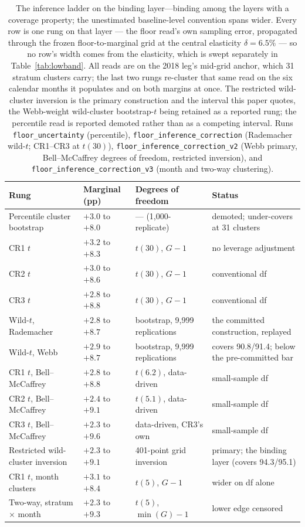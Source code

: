 \documentclass[12pt]{article}
\begin{document}
\begin{table}[!t]
\centering
\caption{The inference ladder on the binding layer---binding among the layers with a coverage property; the unestimated baseline-level convention spans wider. Every row is one rung on that layer --- the floor read's own sampling error, propagated through the frozen floor-to-marginal grid at the central elasticity $\delta = 6.5\%$ --- so no row's width comes from the elasticity, which is swept separately in Table~\ref{tab:lowband}. All reads are on the 2018 leg's mid-grid anchor, which 31 stratum clusters carry; the last two rungs re-cluster that same read on the six calendar months it populates and on both margins at once. The restricted wild-cluster inversion is the primary construction and the interval this paper quotes, the Webb-weight wild-cluster bootstrap-$t$ being retained as a reported rung; the percentile read is reported demoted rather than as a competing interval. Runs \texttt{floor\_uncertainty} (percentile), \texttt{floor\_inference\_correction} (Rademacher wild-$t$; CR1--CR3 at $t(30)$), \texttt{floor\_inference\_correction\_v2} (Webb primary, Bell--McCaffrey degrees of freedom, restricted inversion), and \texttt{floor\_inference\_correction\_v3} (month and two-way clustering).}
\label{tab:ladder}
\footnotesize
\begin{threeparttable}
\begin{tabular}{@{}llll@{}}
\toprule
Rung & Marginal (pp) & Degrees of freedom & Status \\
\midrule
Percentile cluster bootstrap & $+3.0$ to $+8.0$ & --- (1{,}000-replicate) & demoted; under-covers at 31 clusters \\
CR1 $t$ & $+3.2$ to $+8.3$ & $t(30)$, $G-1$ & no leverage adjustment \\
CR2 $t$ & $+3.0$ to $+8.6$ & $t(30)$, $G-1$ & conventional df \\
CR3 $t$ & $+2.8$ to $+8.8$ & $t(30)$, $G-1$ & conventional df \\
Wild-$t$, Rademacher & $+2.8$ to $+8.7$ & bootstrap, 9{,}999 replications & the committed construction, replayed \\
Wild-$t$, Webb & $+2.9$ to $+8.7$ & bootstrap, 9{,}999 replications & covers 90.8/91.4; below the pre-committed bar \\
CR1 $t$, Bell--McCaffrey & $+2.8$ to $+8.8$ & $t(6.2)$, data-driven & small-sample df \\
CR2 $t$, Bell--McCaffrey & $+2.4$ to $+9.1$ & $t(5.1)$, data-driven & small-sample df \\
CR3 $t$, Bell--McCaffrey & $+2.3$ to $+9.6$ & data-driven, CR3's own & small-sample df \\
Restricted wild-cluster inversion & $+2.3$ to $+9.1$ & 401-point grid inversion & primary; the binding layer (covers 94.3/95.1) \\
CR1 $t$, month clusters & $+3.1$ to $+8.4$ & $t(5)$, $G-1$ & wider on df alone \\
Two-way, stratum $\times$ month & $+2.3$ to $+9.3$ & $t(5)$, $\min(G)-1$ & lower edge censored \\
\bottomrule
\end{tabular}
\end{threeparttable}
\end{table}
\end{document}
